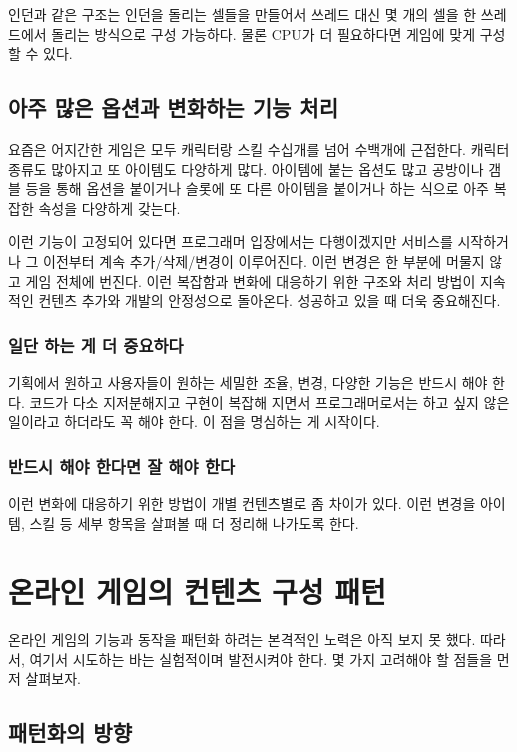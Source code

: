 \documentclass[chapter,kosection, 10.5pt, romanfixed, a4paper]{oblivoir}
\begin{document}
인던과 같은 구조는 인던을 돌리는 셀들을 만들어서 쓰레드 대신 몇 개의 셀을 한 쓰레드에서 돌리는 방식으로
구성 가능하다. 물론 CPU가 더 필요하다면 게임에 맞게 구성할 수 있다. 

\subsection{아주 많은 옵션과 변화하는 기능 처리}

요즘은 어지간한 게임은 모두 캐릭터랑 스킬 수십개를 넘어 수백개에 근접한다. 캐릭터 종류도 많아지고
또 아이템도 다양하게 많다. 아이템에 붙는 옵션도 많고 공방이나 갬블 등을 통해 옵션을 붙이거나 
슬롯에 또 다른 아이템을 붙이거나 하는 식으로 아주 복잡한 속성을 다양하게 갖는다. 

이런 기능이 고정되어 있다면 프로그래머 입장에서는 다행이겠지만 서비스를 시작하거나 그 이전부터 
계속 추가/삭제/변경이 이루어진다. 이런 변경은 한 부분에 머물지 않고 게임 전체에 번진다. 이런 복잡함과 
변화에 대응하기 위한 구조와 처리 방법이 지속적인 컨텐츠 추가와 개발의 안정성으로 돌아온다. 성공하고 
있을 때 더욱 중요해진다. 

\subsubsection{일단 하는 게 더 중요하다}

기획에서 원하고 사용자들이 원하는 세밀한 조율, 변경, 다양한 기능은 반드시 해야 한다. 코드가 다소 지저분해지고
구현이 복잡해 지면서 프로그래머로서는 하고 싶지 않은 일이라고 하더라도 꼭 해야 한다. 이 점을 명심하는 게 
시작이다. 

\subsubsection{반드시 해야 한다면 잘 해야 한다}

이런 변화에 대응하기 위한 방법이 개별 컨텐츠별로 좀 차이가 있다. 이런 변경을 아이템, 스킬 등 세부 항목을 
살펴볼 때 더 정리해 나가도록 한다. 


\section{온라인 게임의 컨텐츠 구성 패턴}

온라인 게임의 기능과 동작을 패턴화 하려는 본격적인 노력은 아직 보지 못 했다. 따라서, 여기서 시도하는 
바는 실험적이며 발전시켜야 한다. 몇 가지 고려해야 할 점들을 먼저 살펴보자. 

\subsection{패턴화의 방향}
\end{document}
